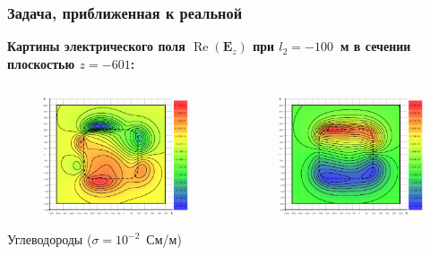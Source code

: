 \documentclass[aspectratio=43,usepdftitle=false]{beamer}
\renewcommand{\Re}{\mathop{\mathrm{Re}}\nolimits}
\newcommand{\MakeTitle}[1]{\frametitle{\hspace{1.5em}\textbf{#1} \hfill \insertframenumber{} }}
\begin{document}
\begin{frame}
	\MakeTitle{Задача, приближенная к реальной}
	\textbf{Картины электрического поля $\Re(\mathbf{E}_z)$ при $l_2 = -100$~м в сечении плоскостью $z=-601$:}
	\begin{columns}[t,totalwidth=\linewidth]
		\hspace{-0.07\linewidth}
		\begin{column}{.5\linewidth}
			\vspace{-2.75em}
			\begin{figure}[H]
				\includegraphics[width=1.1\textwidth,height=1.1\textheight,keepaspectratio]{100_no_z=-601_EzR.eps}
			\end{figure}
			\begin{center}
				\vspace{-1em}
				\tiny{Углеводороды ($\sigma = 10^{-2}$~См/м)}
			\end{center}
		\end{column}
		\begin{column}{.5\linewidth}
			\vspace{-2.75em}
			\begin{figure}[H]
				\includegraphics[width=1.1\textwidth,height=1.1\textheight,keepaspectratio]{100_yes_z=-601_EzR.eps}

\end{figure}
\end{column}
\end{columns}
\end{frame}
\end{document}
